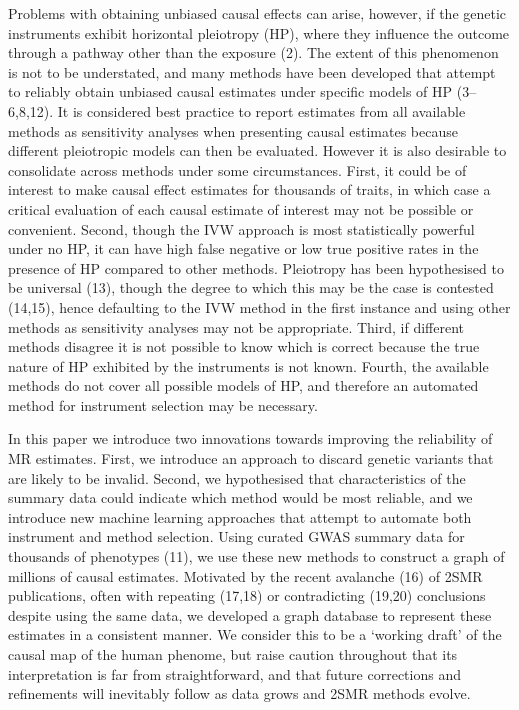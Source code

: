 \documentclass[]{article}
\begin{document}
Problems with obtaining unbiased causal effects can arise, however, if
the genetic instruments exhibit horizontal pleiotropy (HP), where they
influence the outcome through a pathway other than the exposure (2). The
extent of this phenomenon is not to be understated, and many methods
have been developed that attempt to reliably obtain unbiased causal
estimates under specific models of HP (3--6,8,12). It is considered best
practice to report estimates from all available methods as sensitivity
analyses when presenting causal estimates because different pleiotropic
models can then be evaluated. However it is also desirable to
consolidate across methods under some circumstances. First, it could be
of interest to make causal effect estimates for thousands of traits, in
which case a critical evaluation of each causal estimate of interest may
not be possible or convenient. Second, though the IVW approach is most
statistically powerful under no HP, it can have high false negative or
low true positive rates in the presence of HP compared to other methods.
Pleiotropy has been hypothesised to be universal (13), though the degree
to which this may be the case is contested (14,15), hence defaulting to
the IVW method in the first instance and using other methods as
sensitivity analyses may not be appropriate. Third, if different methods
disagree it is not possible to know which is correct because the true
nature of HP exhibited by the instruments is not known. Fourth, the
available methods do not cover all possible models of HP, and therefore
an automated method for instrument selection may be necessary.

In this paper we introduce two innovations towards improving the
reliability of MR estimates. First, we introduce an approach to discard
genetic variants that are likely to be invalid. Second, we hypothesised
that characteristics of the summary data could indicate which method
would be most reliable, and we introduce new machine learning approaches
that attempt to automate both instrument and method selection. Using
curated GWAS summary data for thousands of phenotypes (11), we use these
new methods to construct a graph of millions of causal estimates.
Motivated by the recent avalanche (16) of 2SMR publications, often with
repeating (17,18) or contradicting (19,20) conclusions despite using the
same data, we developed a graph database to represent these estimates in
a consistent manner. We consider this to be a `working draft' of the
causal map of the human phenome, but raise caution throughout that its
interpretation is far from straightforward, and that future corrections
and refinements will inevitably follow as data grows and 2SMR methods
evolve.
\end{document}
